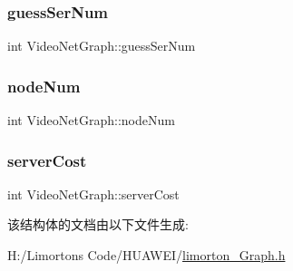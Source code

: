 \subsubsection{\texorpdfstring{guess\+Ser\+Num}{guessSerNum}}
{\footnotesize\ttfamily int Video\+Net\+Graph\+::guess\+Ser\+Num}

\mbox{\label{struct_video_net_graph_aa28dbb6f5bba2d61fd8e2639151d7b73}} 
\subsubsection{\texorpdfstring{node\+Num}{nodeNum}}
{\footnotesize\ttfamily int Video\+Net\+Graph\+::node\+Num}

\mbox{\label{struct_video_net_graph_a9b9eb7b8ecf68a7bc4fd2d3f1ebaf610}} 
\subsubsection{\texorpdfstring{server\+Cost}{serverCost}}
{\footnotesize\ttfamily int Video\+Net\+Graph\+::server\+Cost}



该结构体的文档由以下文件生成\+:\begin{DoxyCompactItemize}
\item 
H\+:/\+Limorton\textquotesingle{}s Code/\+H\+U\+A\+W\+E\+I/\hyperlink{limorton___graph_8h}{limorton\+\_\+\+Graph.\+h}\end{DoxyCompactItemize}
